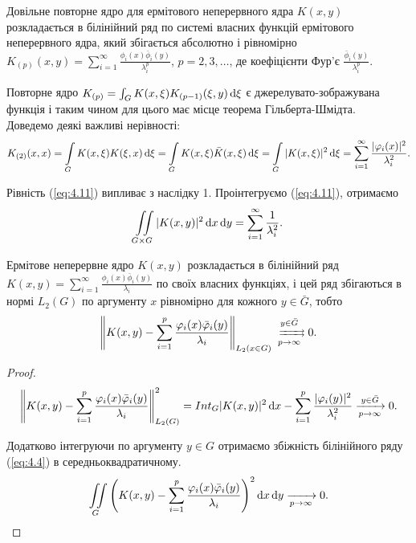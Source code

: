 \begin{corollary}
	Довільне повторне ядро для ермітового неперервного ядра $K(x ,y)$ розкладається в білінійний ряд по системі власних функцій ермітового неперервного ядра, який збігається абсолютно і рівномірно $K_{(p)}(x, y) = \sum_{i = 1}^\infty \frac{\phi_i(x) \bar \phi_i(y)}{\lambda_i^p}$, $p = 2, 3, \ldots$, де коефіцієнти Фур'є  $\frac{\bar \phi_i(y)}{\lambda_i^p}$.
\end{corollary}

Повторне ядро $K_{(p)} = \int_G K(x, \xi) K_{(p - 1)} (\xi, y) \mathop{}\!\mathrm{d} \xi$ є джерелувато-зображувана функція і таким чином для цього має місце теорема Гільберта-Шмідта. \\

Доведемо деякі важливі нерівності:
\begin{equation}
	\label{eq:4.11}
	K_{(2)} (x, x) = \displaystyle\int\limits_G K(x, \xi) K(\xi, x) \mathop{}\!\mathrm{d} \xi = \displaystyle\int\limits_G K(x, \xi) \bar K(x, \xi) \mathop{}\!\mathrm{d} \xi = \displaystyle\int\limits_G |K(x, \xi)|^2 \mathop{}\!\mathrm{d} \xi = \displaystyle\sum\limits_{i = 1}^\infty \dfrac{|\varphi_i(x)|^2}{\lambda_i^2}.
\end{equation}

Рівність (\ref{eq:4.11}) випливає з наслідку 1. Проінтегруємо (\ref{eq:4.11}), отримаємо
\begin{equation}
	\label{eq:4.12}
	\displaystyle\iint\limits_{G \times G} |K(x, y)|^2 \mathop{}\!\mathrm{d} x \mathop{}\!\mathrm{d} y = \displaystyle\sum\limits_{i = 1}^\infty \dfrac{1}{\lambda_i^2}.
\end{equation}

\begin{theorem}
	Ермітове неперервне ядро $K(x, y)$ розкладається в білінійний ряд $K(x, y) = \sum_{i=1}^\infty \frac{\phi_i(x) \bar \phi_i(y)}{\lambda_i}$ по своїх власних функціях, і цей ряд збігаються в нормі $L_2(G)$ по аргументу $x$ рівномірно для кожного $y \in \bar G$, тобто 
	\[ \left\| K(x, y) - \Sum_{i=1}^p \dfrac{\phi_i(x)\bar \phi_i(y)}{\lambda_i}\right\|_{L_2(x \in G)} \xrightrightarrows[p \to \infty]{y \in \bar G} 0. \]
\end{theorem}
\begin{proof}
	\[ \left\| K(x, y) - \displaystyle\sum\limits_{i = 1}^p \dfrac{\varphi_i(x) \bar {\varphi}_i(y)}{\lambda_i} \right\|_{L_2(G)}^2 = Int_G |K(x, y)|^2 \mathop{}\!\mathrm{d} x - \displaystyle\sum\limits_{i = 1}^p \dfrac{|\varphi_i(y)|^2}{\lambda_i^2} \xrightarrow[p \to \infty]{y \in \bar G} 0. \]

	Додатково інтегруючи по аргументу $y \in G$ отримаємо збіжність білінійного ряду (\ref{eq:4.4}) в середньоквадратичному.
	\begin{equation}
		\label{eq:4.13}
		\displaystyle\iint\limits_G \left( K(x, y) - \displaystyle\sum\limits_{i = 1}^p \dfrac{\varphi_i(x) \bar {\varphi}_i(y)}{\lambda_i} \right)^2 \mathop{}\!\mathrm{d} x \mathop{}\!\mathrm{d} y \xrightarrow[p \to \infty]{} 0.
	\end{equation}
\end{proof}

